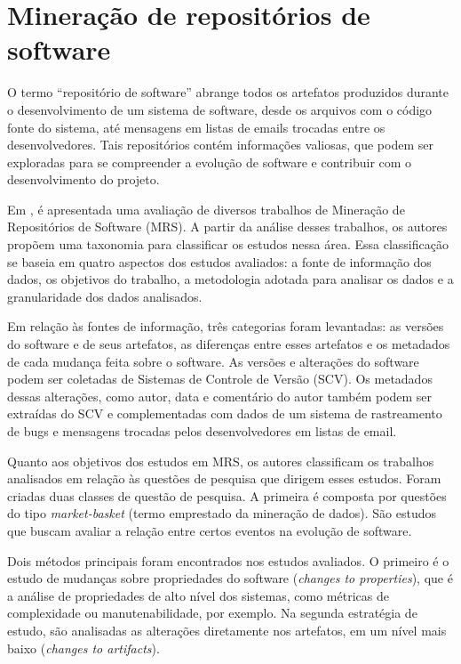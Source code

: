 \documentclass[a4paper, 12pt, twoside]{book}
\begin{document}
    \section{Mineração de repositórios de software}
        O termo ``repositório de software'' abrange todos os artefatos produzidos durante o 
        desenvolvimento de um sistema de software, desde os arquivos com o código fonte do sistema, até mensagens em listas de emails trocadas entre os desenvolvedores. Tais 
        repositórios contém informações valiosas, que podem ser exploradas para se compreender
        a evolução de software e contribuir com o desenvolvimento do projeto.

        Em \cite{Kagdi:2007}, é apresentada uma avaliação de diversos trabalhos de Mineração
        de Repositórios de Software (MRS). A partir da análise desses trabalhos, os autores propõem
        uma taxonomia para classificar os estudos nessa área. Essa classificação se baseia
        em quatro aspectos dos estudos avaliados: a fonte de informação dos dados, os objetivos
        do trabalho, a metodologia adotada para analisar os dados e a granularidade dos dados
        analisados.

        Em relação às fontes de informação, três categorias foram levantadas: as versões do software 
        e de seus artefatos, as diferenças entre esses artefatos e os metadados de cada mudança
        feita sobre o software. As versões e alterações do software podem ser coletadas de Sistemas
        de Controle de Versão (SCV). Os metadados dessas alterações, como autor, data e comentário do 
        autor também podem ser extraídas do SCV e complementadas com dados de um sistema de 
        rastreamento de bugs e mensagens trocadas pelos desenvolvedores em listas de email.

        Quanto aos objetivos dos estudos em MRS, os autores classificam os trabalhos analisados
        em relação às questões de pesquisa que dirigem esses estudos. Foram criadas duas classes
        de questão de pesquisa. A primeira é composta por questões do tipo \textit{market-basket}
        (termo emprestado da mineração de dados). São estudos que buscam avaliar a relação
        entre certos eventos na evolução de software.

        Dois métodos principais foram encontrados nos estudos avaliados. O primeiro é o estudo
        de mudanças sobre propriedades do software (\textit{changes to properties}), que é a 
        análise de propriedades de alto nível dos sistemas, como métricas de complexidade ou
        manutenabilidade, por exemplo. Na segunda estratégia de estudo, são analisadas 
        as alterações diretamente nos artefatos, em um nível mais baixo 
        (\textit{changes to artifacts}).
\end{document}
